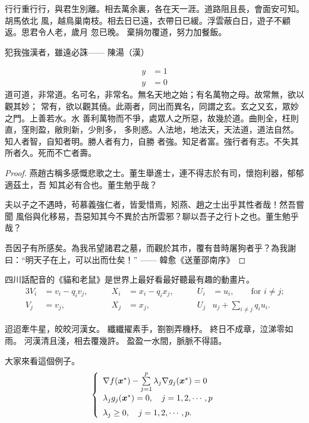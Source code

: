 行行重行行，與君生別離。相去萬余裏，各在天一涯。道路阻且長，會面安可知。胡馬依北
風，越鳥巢南枝。相去日已遠，衣帶日已緩。浮雲蔽白日，遊子不顧返。思君令人老，歲月
忽已晚。  棄捐勿覆道，努力加餐飯。

\begin{theorem}\label{the:theorem1}
犯我強漢者，雖遠必誅\hfill —— 陳湯（漢）
\end{theorem}
\begin{subequations}
\begin{align}
y & = 1 \\
y & = 0
\end{align}
\end{subequations}
道可道，非常道。名可名，非常名。無名天地之始；有名萬物之母。故常無，欲以觀其妙；
常有，欲以觀其僥。此兩者，同出而異名，同謂之玄。玄之又玄，眾妙之門。上善若水。水
善利萬物而不爭，處眾人之所惡，故幾於道。曲則全，枉則直，窪則盈，敝則新，少則多，
多則惑。人法地，地法天，天法道，道法自然。知人者智，自知者明。勝人者有力，自勝
者強。知足者富。強行者有志。不失其所者久。死而不亡者壽。

\begin{proof}
燕趙古稱多感慨悲歌之士。董生舉進士，連不得志於有司，懷抱利器，郁郁適茲土，吾
知其必有合也。董生勉乎哉？

夫以子之不遇時，茍慕義強仁者，皆愛惜焉，矧燕、趙之士出乎其性者哉！然吾嘗聞
風俗與化移易，吾惡知其今不異於古所雲邪？聊以吾子之行卜之也。董生勉乎哉？

吾因子有所感矣。為我吊望諸君之墓，而觀於其市，覆有昔時屠狗者乎？為我謝
曰：“明天子在上，可以出而仕矣！” \hfill —— 韓愈《送董邵南序》
\end{proof}

\begin{corollary}
  四川話配音的《貓和老鼠》是世界上最好看最好聽最有趣的動畫片。
\begin{alignat}{3}
V_i & =v_i - q_i v_j, & \qquad X_i & = x_i - q_i x_j,
 & \qquad U_i & = u_i,
 \qquad \text{for $i\ne j$;}\label{eq:B}\\
V_j & = v_j, & \qquad X_j & = x_j,
  & \qquad U_j & u_j + \sum_{i\ne j} q_i u_i.
\end{alignat}
\end{corollary}

迢迢牽牛星，皎皎河漢女。
纖纖擢素手，劄劄弄機杼。
終日不成章，泣涕零如雨。
河漢清且淺，相去覆幾許。
盈盈一水間，脈脈不得語。

\begin{example}
  大家來看這個例子。
\begin{equation}
\label{ktc}
\left\{\begin{array}{l}
\nabla f({\mbox{\boldmath $x$}}^*)-\sum\limits_{j=1}^p\lambda_j\nabla g_j({\mbox{\boldmath $x$}}^*)=0\\[0.3cm]
\lambda_jg_j({\mbox{\boldmath $x$}}^*)=0,\quad j=1,2,\cdots,p\\[0.2cm]
\lambda_j\ge 0,\quad j=1,2,\cdots,p.
\end{array}\right.
\end{equation}
\end{example}

